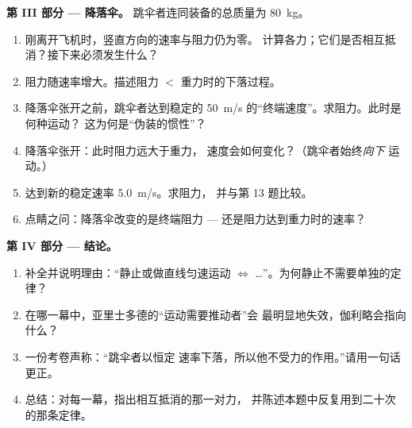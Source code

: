 \begin{problem}
\medskip
\noindent\textbf{第 III 部分 --- 降落伞。}
跳伞者连同装备的总质量为 \qty{80}{kg}。
\begin{enumerate}[resume]
  \item 刚离开飞机时，竖直方向的速率与阻力仍为零。
        计算各力；它们是否相互抵消？接下来必须发生什么？
  \item 阻力随速率增大。描述阻力 $<$ 重力时的下落过程。
  \item 降落伞张开之前，跳伞者达到稳定的
        \qty{50}{m/s} 的“终端速度”。求阻力。此时是何种运动？
        这为何是“伪装的惯性”？
  \item 降落伞张开：此时阻力远大于重力，
        速度会如何变化？（跳伞者始终\emph{向下}
        运动。）
  \item 达到新的稳定速率 \qty{5.0}{m/s}。求阻力，
        并与第 13 题比较。
  \item 点睛之问：降落伞改变的是终端阻力 ---
        还是阻力达到重力时的速率？
\end{enumerate}

\medskip
\noindent\textbf{第 IV 部分 --- 结论。}
\begin{enumerate}[resume]
  \item 补全并说明理由：“静止或做直线匀速运动
        $\iff$ \dots”。为何静止不需要单独的定律？
  \item 在哪一幕中，亚里士多德的“运动需要推动者”会
        最明显地失效，伽利略会指向什么？
  \item 一份考卷声称：“跳伞者以恒定
        速率下落，所以他不受力的作用。”请用一句话更正。
  \item 总结：对每一幕，指出相互抵消的那一对力，
        并陈述本题中反复用到二十次的那条定律。
\end{enumerate}
\end{problem}
